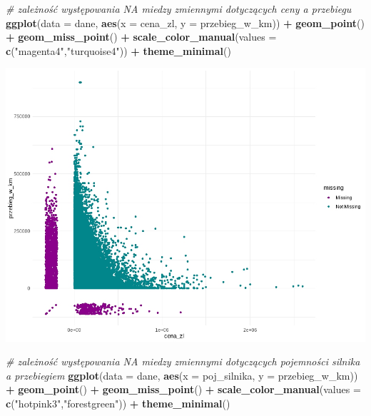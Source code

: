 \documentclass[
]{article}
\newenvironment{Shaded}{\begin{snugshade}}{\end{snugshade}}
\newcommand{\AttributeTok}[1]{\textcolor[rgb]{0.13,0.29,0.53}{#1}}
\newcommand{\CommentTok}[1]{\textcolor[rgb]{0.56,0.35,0.01}{\textit{#1}}}
\newcommand{\FunctionTok}[1]{\textcolor[rgb]{0.13,0.29,0.53}{\textbf{#1}}}
\newcommand{\NormalTok}[1]{#1}
\newcommand{\SpecialCharTok}[1]{\textcolor[rgb]{0.81,0.36,0.00}{\textbf{#1}}}
\newcommand{\StringTok}[1]{\textcolor[rgb]{0.31,0.60,0.02}{#1}}
\begin{document}
\begin{Shaded}
\begin{Highlighting}[]
\CommentTok{\# zależność występowania NA miedzy zmiennymi dotyczących ceny a przebiegu }
\FunctionTok{ggplot}\NormalTok{(}\AttributeTok{data =}\NormalTok{ dane, }\FunctionTok{aes}\NormalTok{(}\AttributeTok{x =}\NormalTok{ cena\_zl, }\AttributeTok{y =}\NormalTok{ przebieg\_w\_km)) }\SpecialCharTok{+} 
  \FunctionTok{geom\_point}\NormalTok{() }\SpecialCharTok{+}
  \FunctionTok{geom\_miss\_point}\NormalTok{() }\SpecialCharTok{+}
  \FunctionTok{scale\_color\_manual}\NormalTok{(}\AttributeTok{values =} \FunctionTok{c}\NormalTok{(}\StringTok{"magenta4"}\NormalTok{,}\StringTok{"turquoise4"}\NormalTok{)) }\SpecialCharTok{+}
  \FunctionTok{theme\_minimal}\NormalTok{()}
\end{Highlighting}
\end{Shaded}

\includegraphics[width=1\linewidth]{images/7}

\begin{Shaded}
\begin{Highlighting}[]
\CommentTok{\# zależność występowania NA miedzy zmiennymi dotyczących pojemności silnika a przebiegiem }
\FunctionTok{ggplot}\NormalTok{(}\AttributeTok{data =}\NormalTok{ dane, }\FunctionTok{aes}\NormalTok{(}\AttributeTok{x =}\NormalTok{ poj\_silnika, }\AttributeTok{y =}\NormalTok{ przebieg\_w\_km)) }\SpecialCharTok{+} 
  \FunctionTok{geom\_point}\NormalTok{() }\SpecialCharTok{+}
  \FunctionTok{geom\_miss\_point}\NormalTok{() }\SpecialCharTok{+}
  \FunctionTok{scale\_color\_manual}\NormalTok{(}\AttributeTok{values =} \FunctionTok{c}\NormalTok{(}\StringTok{"hotpink3"}\NormalTok{,}\StringTok{"forestgreen"}\NormalTok{)) }\SpecialCharTok{+}
  \FunctionTok{theme\_minimal}\NormalTok{()}
\end{Highlighting}
\end{Shaded}
\end{document}
